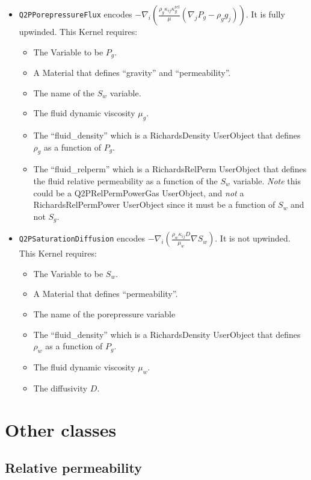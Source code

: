 \documentclass[]{scrreprt}
\begin{document}
\begin{itemize}
\item {\tt Q2PPorepressureFlux} encodes $ - \nabla_{i}
\left( \frac{\rho_{g} \kappa_{ij}\kappa_{g}^{\mathrm{rel}}}{\mu}
(\nabla_{j}P_{g} - \rho_{g} g_{j}) \right)$.  It is fully upwinded.
This Kernel requires:
\begin{itemize}
\item The Variable to be $P_{g}$.
\item A Material that defines ``gravity'' and ``permeability''.
\item The name of the $S_{w}$ variable.
\item The fluid dynamic viscosity $\mu_{g}$.
\item The ``fluid\_density'' which is a RichardsDensity
  UserObject that defines $\rho_{g}$ as a function of $P_{g}$.
\item The ``fluid\_relperm'' which is a RichardsRelPerm UserObject that
  defines the fluid relative permeability as a function of the $S_{w}$
  variable.  {\em Note} this could be a Q2PRelPermPowerGas UserObject,
  and {\em not} a RichardsRelPermPower UserObject since it must be a
  function of $S_{w}$ and {\em} not $S_{g}$.
\end{itemize}

\item {\tt Q2PSaturationDiffusion} encodes $- \nabla_{i}\left(
\frac{\rho_{w}\kappa_{ij}D}{\mu_{w}} \nabla S_{w} \right)$.  It is not
upwinded.  This Kernel requires:
\begin{itemize}
\item The Variable to be $S_{w}$.
\item A Material that defines ``permeability''.
\item The name of the porepressure variable
\item The ``fluid\_density'' which is a RichardsDensity
  UserObject that defines $\rho_{w}$ as a function of $P_{g}$.
\item The fluid dynamic viscosity $\mu_{w}$.
\item The diffusivity $D$.
\end{itemize}

\end{itemize}


\section{Other classes}

\subsection{Relative permeability}
\end{document}
